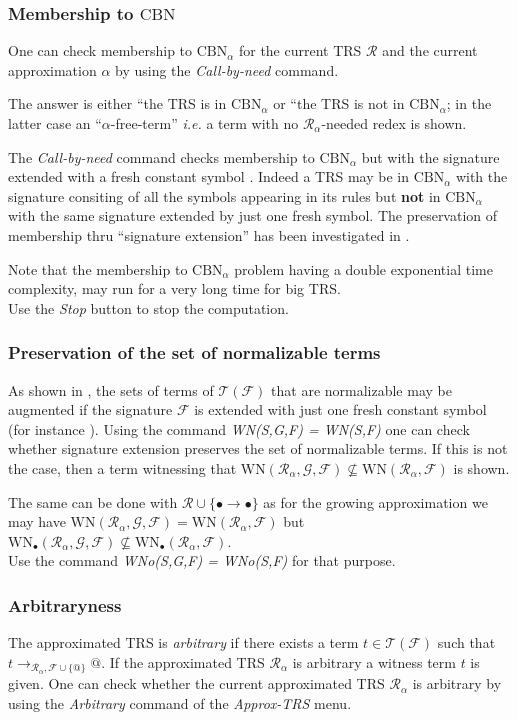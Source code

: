 \documentclass[11pt]{llncs}
\newcommand{\RR}{\mathcal{R}}
\newcommand{\FF}{\mathcal{F}}
\newcommand{\GG}{\mathcal{G}}
\newcommand{\TT}{\mathcal{T}}
\newcommand{\CBN}{\text{CBN}}
\newcommand{\WN}{\text{WN}}
\def\autocom#1{\textsl{#1 }}
\begin{document}
\subsubsection{Membership to $\CBN$}
One can check membership to $\CBN_\alpha$ for the current TRS $\RR$ 
and the current approximation $\alpha$ by using the \autocom{Call-by-need} 
command.

The answer is either ``the TRS is in $\CBN_\alpha$ or
``the TRS is not in $\CBN_\alpha$; in the latter case an 
``$\alpha$-free-term''
\emph{i.e.} a term with no $\RR_\alpha$-needed redex is shown.

The \autocom{Call-by-need\@} command checks membership to $\CBN_\alpha$ 
but with the signature extended with a fresh constant symbol \autocom{\@}.
Indeed a TRS may be in $\CBN_\alpha$ with the signature consiting of 
all the symbols appearing in its rules but {\bf not} in $\CBN_\alpha$ with 
the same signature extended by just one fresh symbol. The preservation of 
membership thru ``signature extension''
has been investigated in \cite{DM01}.

Note that the membership to $\CBN_\alpha$ problem 
having a double exponential time complexity,
may run for a very long time for big TRS.\\
Use the \autocom{Stop} button to stop the computation.

\subsubsection{Preservation of the set of normalizable terms}
As shown in \cite{DM01}, the sets of terms of $\TT(\FF)$ that are normalizable
may be augmented if the signature $\FF$ is extended with just one fresh constant
symbol (for instance \@).
Using the command \autocom{WN(S,G,F) = WN(S,F)} one can check whether signature
extension preserves the set of normalizable terms. If this is not the case,
then a term witnessing that $\WN(\RR_\alpha,\GG,\FF) \not\subseteq \WN(\RR_\alpha,\FF)$ is shown.

The same can be done with $\RR \cup \{ \bullet \to \bullet \}$ as for the growing
approximation we may have 
$\WN(\RR_\alpha,\GG,\FF) = \WN(\RR_\alpha,\FF)$ but $
\WN_\bullet(\RR_\alpha,\GG,\FF) \not\subseteq \WN_\bullet(\RR_\alpha,\FF)$.\\
Use the command \autocom{WNo(S,G,F) = WNo(S,F)} for that purpose.

\subsubsection{Arbitraryness}
The approximated TRS is \emph{arbitrary} if there exists a term $t \in \TT(\FF)$
such that $t \to_{\RR_\alpha,\FF \cup \{ @ \}} @$.
If the approximated TRS $\RR_\alpha$ is arbitrary a witness term $t$ is given.
One can check whether the current approximated TRS $\RR_\alpha$ 
is arbitrary by using the \autocom{Arbitrary} command of the \autocom{Approx-TRS}
menu.
\end{document}
